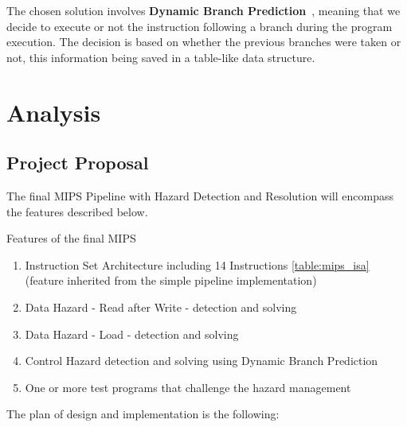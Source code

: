 \documentclass[a4paper,12pt]{report}
\begin{document}
The chosen solution involves \textbf{Dynamic Branch Prediction}~\cite{patterson2014computer}, meaning that we decide to execute or not the instruction following a branch during the program execution. The decision is based on whether the previous branches were taken or not, this information being saved in a table-like data structure.

\chapter{Analysis}
\section{Project Proposal}
The final MIPS Pipeline with Hazard Detection and Resolution will encompass the features described below.
\begin{my-list}{Features of the final MIPS}
\begin{enumerate}
    \item Instruction Set Architecture including 14 Instructions \ref{table:mips_isa} (feature inherited from the simple pipeline implementation)
    \item Data Hazard - Read after Write - detection and solving
    \item Data Hazard - Load - detection and solving
    \item Control Hazard detection and solving using Dynamic Branch Prediction
    \item One or more test programs that challenge the hazard management
\end{enumerate} 
\end{my-list}

The plan of design and implementation is the following:
\end{document}
